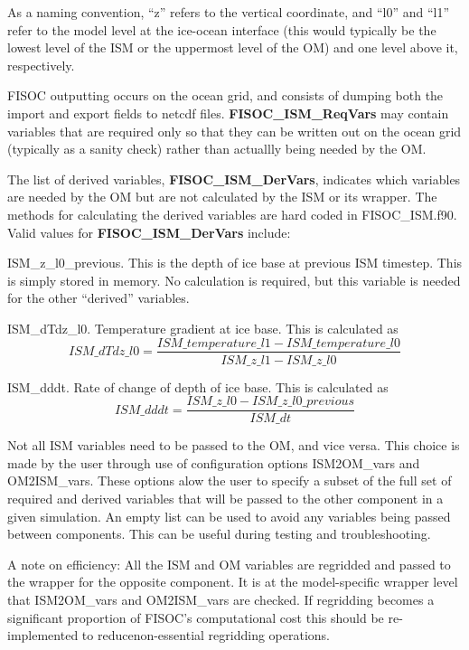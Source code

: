 \documentclass[12pt]{article}
\begin{document}
As a naming convention, ``z'' refers to the vertical coordinate, and ``l0'' and ``l1'' refer to the 
model level at the ice-ocean interface (this would typically be the lowest level of the ISM or 
the uppermost level of the OM) and one level above it, respectively.

FISOC outputting occurs on the ocean grid, and consists of dumping both the import and 
export fields to netcdf files. 
\textbf{FISOC\_ISM\_ReqVars} may contain variables that are required only so that they can be written 
out on the ocean grid (typically as a sanity check) rather than actuallly being needed by the OM.


The list of derived variables, \textbf{FISOC\_ISM\_DerVars}, indicates which variables are needed by the 
OM but are not calculated by the ISM or its wrapper. 
The methods for calculating the derived variables are hard coded in FISOC\_ISM.f90. 
Valid values for  \textbf{FISOC\_ISM\_DerVars} include:

ISM\_z\_l0\_previous.  This is the depth of ice base at previous ISM timestep. This is simply stored 
in memory.  No calculation is required, but this variable is needed for the other ``derived'' variables. 

ISM\_dTdz\_l0.  Temperature gradient at ice base.  This is calculated as 
\begin{equation}
ISM\_dTdz\_l0 = \frac{ISM\_temperature\_l1 - ISM\_temperature\_l0}{ISM\_z\_l1 - ISM\_z\_l0}
\end{equation}

ISM\_dddt.  Rate of change of depth of ice base.  This is calculated as 
\begin{equation}
ISM\_dddt = \frac{ISM\_z\_l0 - ISM\_z\_l0\_previous}{ISM\_dt}
\end{equation}

Not all ISM variables need to be passed to the OM, and vice versa.  
This choice is made by the 
user through use of configuration options ISM2OM\_vars and OM2ISM\_vars.  
These options alow the user to specify a subset of the full set of 
required and derived variables that will be passed to the other component 
in a given simulation.  An empty list can be used to avoid any variables 
being passed between components.  This can be useful during testing and 
troubleshooting.

A note on efficiency: All the ISM and OM variables are regridded and passed 
to the wrapper for the opposite component.  It is at the model-specific 
wrapper level that ISM2OM\_vars and OM2ISM\_vars are checked.  If regridding 
becomes a significant proportion of FISOC's computational cost this 
should be re-implemented to reducenon-essential regridding operations.
\end{document}
